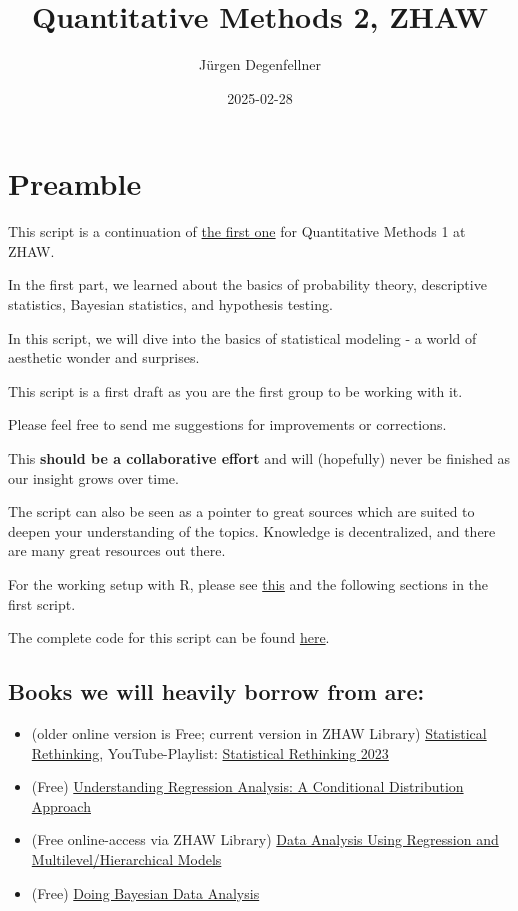 \documentclass[
]{book}
\title{Quantitative Methods 2, ZHAW}
\author{Jürgen Degenfellner}
\date{2025-02-28}
\providecommand{\tightlist}{%
  \setlength{\itemsep}{0pt}\setlength{\parskip}{0pt}}
\begin{document}
\maketitle

{
\setcounter{tocdepth}{1}
\tableofcontents
}
\chapter{Preamble}\label{intro0}

This script is a continuation of
\href{https://jdegenfellner.github.io/Script_QM1_ZHAW/}{the first one} for Quantitative Methods 1
at ZHAW.

In the first part, we learned about the basics of probability theory,
descriptive statistics, Bayesian statistics, and hypothesis testing.

In this script, we will dive into the basics of statistical modeling -
a world of aesthetic wonder and surprises.

This script is a first draft as you are the first group to be working with it.

Please feel free to send me suggestions for improvements or corrections.

This \textbf{should be a collaborative effort} and will (hopefully)
never be finished as our insight grows over time.

The script can also be seen as a pointer to great sources which are
suited to deepen your understanding of the topics. Knowledge is decentralized,
and there are many great resources out there.

For the working setup with R, please
see \href{https://jdegenfellner.github.io/Script_QM1_ZHAW/index.html\#section}{this}
and the following sections in the first script.

The complete code for this script can be found
\href{https://github.com/jdegenfellner/Script_QM2_ZHAW}{here}.

\section{Books we will heavily borrow from are:}\label{books-we-will-heavily-borrow-from-are}

\begin{itemize}
\tightlist
\item
  (older online version is Free; current version in ZHAW Library) \href{https://civil.colorado.edu/~balajir/CVEN6833/bayes-resources/RM-StatRethink-Bayes.pdf}{Statistical Rethinking}, YouTube-Playlist: \href{https://youtu.be/FdnMWdICdRs?si=q2py5QVY_L299hEa}{Statistical Rethinking 2023}
\item
  (Free) \href{https://vdoc.pub/documents/understanding-regression-analysis-a-conditional-distribution-approach-84oqjr8sqva0}{Understanding Regression Analysis: A Conditional Distribution Approach}
\item
  (Free online-access via ZHAW Library) \href{http://www.stat.columbia.edu/~gelman/arm/}{Data Analysis Using Regression and Multilevel/Hierarchical Models}
\item
  (Free) \href{https://nyu-cdsc.github.io/learningr/assets/kruschke_bayesian_in_R.pdf}{Doing Bayesian Data Analysis}
\end{itemize}
\end{document}

